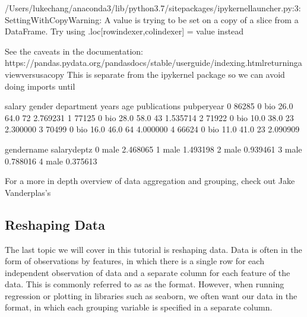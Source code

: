 \documentclass[letterpaper,10pt,english]{sphinxmanual}
\begin{document}
\begin{sphinxVerbatim}[commandchars=\\\{\}]
/Users/lukechang/anaconda3/lib/python3.7/site\PYGZhy{}packages/ipykernel\PYGZus{}launcher.py:3: SettingWithCopyWarning: 
A value is trying to be set on a copy of a slice from a DataFrame.
Try using .loc[row\PYGZus{}indexer,col\PYGZus{}indexer] = value instead

See the caveats in the documentation: https://pandas.pydata.org/pandas\PYGZhy{}docs/stable/user\PYGZus{}guide/indexing.html\PYGZsh{}returning\PYGZhy{}a\PYGZhy{}view\PYGZhy{}versus\PYGZhy{}a\PYGZhy{}copy
  This is separate from the ipykernel package so we can avoid doing imports until
\end{sphinxVerbatim}

\begin{sphinxVerbatim}[commandchars=\\\{\}]
   salary  gender department  years   age  publications  pub\PYGZus{}per\PYGZus{}year  \PYGZbs{}
0   86285       0        bio   26.0  64.0            72      2.769231   
1   77125       0        bio   28.0  58.0            43      1.535714   
2   71922       0        bio   10.0  38.0            23      2.300000   
3   70499       0        bio   16.0  46.0            64      4.000000   
4   66624       0        bio   11.0  41.0            23      2.090909   

  gender\PYGZus{}name  salary\PYGZus{}dept\PYGZus{}z  
0        male       2.468065  
1        male       1.493198  
2        male       0.939461  
3        male       0.788016  
4        male       0.375613  
\end{sphinxVerbatim}

For a more in depth overview of data aggregation and grouping, check out Jake Vanderplas’s 


\subsection{Reshaping Data}
\label{\detokenize{content/Introduction_to_Pandas:reshaping-data}}
The last topic we will cover in this tutorial is reshaping data. Data is often in the form of observations by features, in which there is a single row for each independent observation of data and a separate column for each feature of the data. This is commonly referred to as as the  format. However, when running regression or plotting in libraries such as seaborn, we often want our data in the  format, in which each grouping variable is specified in a separate column.
\end{document}
